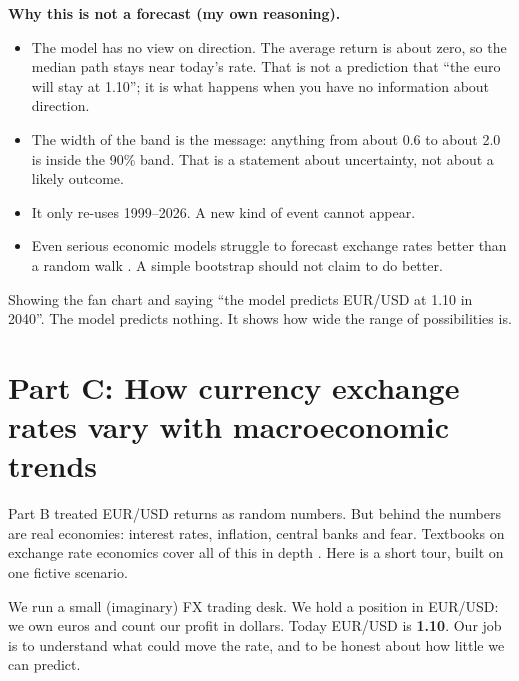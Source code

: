 \documentclass[11pt,a4paper]{article}
\begin{document}
\textbf{Why this is not a forecast (my own reasoning).}
\begin{itemize}
  \item The model has no view on direction. The average return is about
    zero, so the median path stays near today's rate. That is not a
    prediction that ``the euro will stay at 1.10''; it is what happens when
    you have no information about direction.
  \item The width of the band is the message: anything from about 0.6 to
    about 2.0 is inside the 90\% band. That is a statement about
    uncertainty, not about a likely outcome.
  \item It only re-uses 1999--2026. A new kind of event cannot appear.
  \item Even serious economic models struggle to forecast exchange rates
    better than a random walk \citep{meese1983,rossi2013}. A simple
    bootstrap should not claim to do better.
\end{itemize}

\begin{mistake}
Showing the fan chart and saying ``the model predicts EUR/USD at 1.10 in
2040''. The model predicts nothing. It shows how wide the range of
possibilities is.
\end{mistake}

\section{Part C: How currency exchange rates vary with macroeconomic
trends}\label{sec:macro}

\begin{center}
\end{center}

Part B treated EUR/USD returns as random numbers. But behind the numbers
are real economies: interest rates, inflation, central banks and fear.
Textbooks on exchange rate economics cover all of this in depth
\citep{sarnotaylor2003}.
Here is a short tour, built on one fictive scenario.

\begin{fictive}
We run a small (imaginary) FX trading desk. We hold a position in EUR/USD:
we own euros and count our profit in dollars. Today EUR/USD is
\textbf{1.10}. Our job is to understand what could move the rate, and to
be honest about how little we can predict.
\end{fictive}
\end{document}
